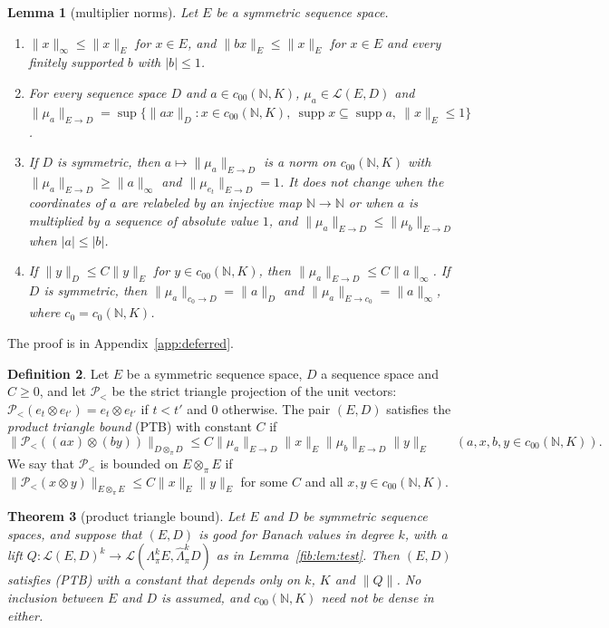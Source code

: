 \documentclass[11pt]{amsart}
\newtheorem{theorem}{Theorem}[section]
\newtheorem{lemma}[theorem]{Lemma}
\theoremstyle{definition}
\newtheorem{definition}[theorem]{Definition}
\theoremstyle{remark}
\numberwithin{equation}{section}
\newcommand{\N}{\mathbb N}
\newcommand{\cL}{\mathcal L}
\newcommand{\abs}[1]{\lvert #1\rvert}
\newcommand{\norm}[1]{\lVert #1\rVert}
\theoremstyle{plain}
\theoremstyle{definition}
\theoremstyle{plain}
\newcommand{\cP}{\mathcal P}
\begin{document}
\begin{lemma}[multiplier norms]\label{obs:lem:multiplier}
Let $E$ be a symmetric sequence space.
\begin{enumerate}
\item $\norm x_\infty\le\norm x_E$ for $x\in E$, and $\norm{bx}_E\le\norm x_E$ for $x\in E$ and every finitely
supported $b$ with $\abs b\le1$.
\item For every sequence space $D$ and $a\in c_{00}(\N,K)$, $\mu_a\in\cL(E,D)$ and
$\norm{\mu_a}_{E\to D}=\sup\{\norm{ax}_D:x\in c_{00}(\N,K),\ \operatorname{supp}x\subseteq\operatorname{supp}a,\
\norm x_E\le1\}$.
\item If $D$ is symmetric, then $a\mapsto\norm{\mu_a}_{E\to D}$ is a norm on $c_{00}(\N,K)$ with
$\norm{\mu_a}_{E\to D}\ge\norm a_\infty$ and $\norm{\mu_{e_t}}_{E\to D}=1$. It does not change when the coordinates
of $a$ are relabeled by an injective map $\N\to\N$ or when $a$ is multiplied by a sequence of absolute value $1$, and
$\norm{\mu_a}_{E\to D}\le\norm{\mu_b}_{E\to D}$ when $\abs a\le\abs b$.
\item If $\norm y_D\le C\norm y_E$ for $y\in c_{00}(\N,K)$, then $\norm{\mu_a}_{E\to D}\le C\norm a_\infty$. If $D$ is
symmetric, then $\norm{\mu_a}_{c_0\to D}=\norm a_D$ and $\norm{\mu_a}_{E\to c_0}=\norm a_\infty$, where $c_0=c_0(\N,K)$.
\end{enumerate}
\end{lemma}

The proof is in Appendix~\ref{app:deferred}.

\begin{definition}\label{obs:def:ptb}
Let $E$ be a symmetric sequence space, $D$ a sequence space and $C\ge0$, and let $\cP_<$ be the strict triangle
projection of the unit vectors: $\cP_<(e_t\otimes e_{t'})=e_t\otimes e_{t'}$ if $t<t'$ and $0$ otherwise. The pair $(E,D)$
satisfies the \emph{product triangle bound} \textup{(PTB)} with constant $C$ if
\begin{equation}\label{obs:eq:ptb}
 \norm{\cP_<((ax)\otimes(by))}_{D\otimes_\pi D}\le C\norm{\mu_a}_{E\to D}\norm x_E\norm{\mu_b}_{E\to D}\norm y_E
 \qquad(a,x,b,y\in c_{00}(\N,K)).
\end{equation}
We say that $\cP_<$ is bounded on $E\otimes_\pi E$ if $\norm{\cP_<(x\otimes y)}_{E\otimes_\pi E}\le C\norm x_E\norm y_E$
for some $C$ and all $x,y\in c_{00}(\N,K)$.
\end{definition}

\begin{theorem}[product triangle bound]\label{obs:thm:ptb}
Let $E$ and $D$ be symmetric sequence spaces, and suppose that $(E,D)$ is good for Banach values in degree $k$, with a
lift $Q\colon\cL(E,D)^k\to\cL(\Lambda^k_\pi E,\widehat\Lambda^k_\pi D)$ as in Lemma~\ref{fib:lem:test}. Then $(E,D)$
satisfies \textup{(PTB)} with a constant that depends only on $k$, $K$ and $\norm Q$. No inclusion between $E$ and $D$ is
assumed, and $c_{00}(\N,K)$ need not be dense in either.
\end{theorem}
\end{document}
